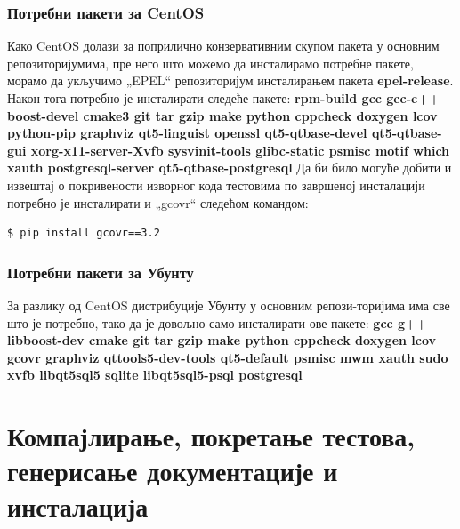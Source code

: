 \documentclass[a4paper, 12pt, diplomski]{etfcyr}
\def\quote#1{„#1“}
\begin{document}
				\subsubsection*{Потребни пакети за CentOS}
					\begin{justify}
						Како CentOS долази за поприлично конзервативним скупом пакета у основним репозиторијумима, пре него што можемо да инсталирамо потребне пакете, морамо да укључимо \quote{EPEL} репозиторијум инсталирањем пакета \textbf{epel-release}. Након тога потребно је инсталирати следеће пакете:
						\newline
						\newline
						\noindent
						\textbf{rpm-build gcc gcc-c++ boost-devel cmake3 git tar gzip make python cppcheck doxygen lcov python-pip graphviz qt5-linguist openssl qt5-qtbase-devel qt5-qtbase-gui xorg-x11-server-Xvfb sysvinit-tools glibc-static psmisc motif which xauth postgresql-server qt5-qtbase-postgresql}
						\newline
						\newline
						\noindent
						Да би било могуће добити и извештај о покривености изворног кода тестовима по завршеној инсталацији потребно је инсталирати и \quote{gcovr} следећом командом:
						\begin{footnotesize}
							\begin{verbatim}
$ pip install gcovr==3.2
							\end{verbatim}
						\end{footnotesize}
					\end{justify}

				\subsubsection*{Потребни пакети за Убунту}
					\begin{justify}
						За разлику од CentOS дистрибуције Убунту у основним репози-торијима има све што је потребно, тако да је довољно само инсталирати ове пакете:
						\newline
						\newline
						\textbf{gcc g++ libboost-dev cmake git tar gzip make python cppcheck doxygen lcov gcovr graphviz qttools5-dev-tools qt5-default psmisc mwm xauth sudo xvfb libqt5sql5 sqlite libqt5sql5-psql postgresql}
					\end{justify}

		\section[Компајлирање, тестови, документација и инсталација]{Компајлирање, покретање тестова, генерисање документације и инсталација}
\end{document}
